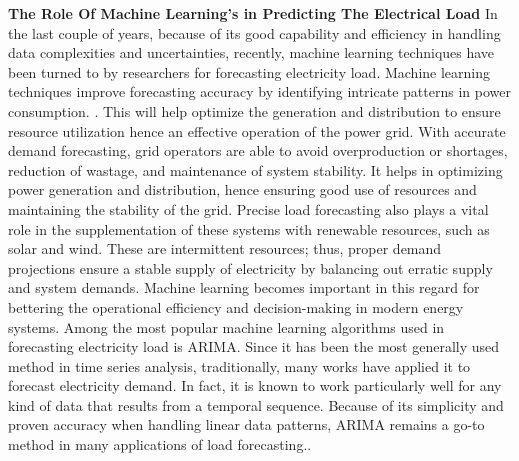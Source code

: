 \documentclass[12pt, a4paper,twoside]{report}
\theoremstyle{plain} %
\theoremstyle{definition} %
\theoremstyle{remark} %
\numberwithin{equation}{chapter}
\begin{document}
\newline
\newline
\textbf{The Role Of Machine Learning's in Predicting The Electrical Load}
\newline
In the last couple of years, because of its good capability and efficiency in handling data complexities and uncertainties, recently, machine learning techniques have been turned to by researchers for forecasting electricity load\cite{behl2016data}. Machine learning techniques improve forecasting accuracy by identifying intricate patterns in power consumption. \cite{hafeez2020electric}. This will help optimize the generation and distribution to ensure resource utilization hence an effective operation of the power grid. With accurate demand forecasting, grid operators are able to avoid overproduction or shortages, reduction of wastage, and maintenance of system stability. It helps in optimizing power generation and distribution, hence ensuring good use of resources and maintaining the stability of the grid. Precise load forecasting also plays a vital role in the supplementation of these systems with renewable resources, such as solar and wind. These are intermittent resources; thus, proper demand projections ensure a stable supply of electricity by balancing out erratic supply and system demands. Machine learning becomes important in this regard for bettering the operational efficiency and decision-making in modern energy systems.
\newline
Among the most popular machine learning algorithms used in forecasting electricity load is ARIMA. Since it has been the most generally used method in time series analysis, traditionally, many works have applied it to forecast electricity demand. In fact, it is known to work particularly well for any kind of data that results from a temporal sequence. Because of its simplicity and proven accuracy when handling linear data patterns, ARIMA remains a go-to method in many applications of load forecasting.\cite{zhou2006trigonometric}.
\newline
\end{document}
